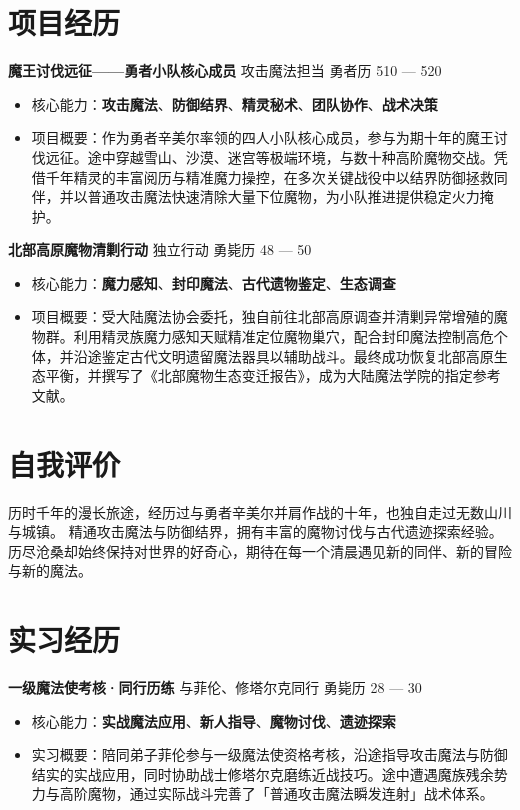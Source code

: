 \documentclass[11pt,a4paper]{article}
\newcommand*{\boldtext}[1]{{\bfseries #1}}
\newcommand{\globalIconSize}{12pt}
\newcommand{\secicon}[1]{{\color{globalIconColor}\fontsize{\globalIconSize}{\globalIconSize}\selectfont #1}}
\begin{document}
\section{\secicon{\faProjectDiagram}\hspace{0.5em}项目经历}
\boldtext{魔王讨伐远征——勇者小队核心成员} \hfill 攻击魔法担当 \hfill 勇者历 510 — 520
\begin{itemize}
    \item 核心能力：\boldtext{攻击魔法}、\boldtext{防御结界}、\boldtext{精灵秘术}、\boldtext{团队协作}、\boldtext{战术决策}
    \item 项目概要：作为勇者辛美尔率领的四人小队核心成员，参与为期十年的魔王讨伐远征。途中穿越雪山、沙漠、迷宫等极端环境，与数十种高阶魔物交战。凭借千年精灵的丰富阅历与精准魔力操控，在多次关键战役中以结界防御拯救同伴，并以普通攻击魔法快速清除大量下位魔物，为小队推进提供稳定火力掩护。
\end{itemize}

\vspace{0.8em}
\boldtext{北部高原魔物清剿行动} \hfill 独立行动 \hfill 勇毙历 48 — 50
\begin{itemize}
    \item 核心能力：\boldtext{魔力感知}、\boldtext{封印魔法}、\boldtext{古代遗物鉴定}、\boldtext{生态调查}
    \item 项目概要：受大陆魔法协会委托，独自前往北部高原调查并清剿异常增殖的魔物群。利用精灵族魔力感知天赋精准定位魔物巢穴，配合封印魔法控制高危个体，并沿途鉴定古代文明遗留魔法器具以辅助战斗。最终成功恢复北部高原生态平衡，并撰写了《北部魔物生态变迁报告》，成为大陆魔法学院的指定参考文献。
\end{itemize}

\section{\secicon{\faUser}\hspace{0.5em}自我评价}
历时千年的漫长旅途，经历过与勇者辛美尔并肩作战的十年，也独自走过无数山川与城镇。
精通攻击魔法与防御结界，拥有丰富的魔物讨伐与古代遗迹探索经验。
历尽沧桑却始终保持对世界的好奇心，期待在每一个清晨遇见新的同伴、新的冒险与新的魔法。

\newpage
\section{\secicon{\faBriefcase}\hspace{0.5em}实习经历}
\boldtext{一级魔法使考核·同行历练} \hfill 与菲伦、修塔尔克同行 \hfill 勇毙历 28 — 30
\begin{itemize}
    \item 核心能力：\boldtext{实战魔法应用}、\boldtext{新人指导}、\boldtext{魔物讨伐}、\boldtext{遗迹探索}
    \item 实习概要：陪同弟子菲伦参与一级魔法使资格考核，沿途指导攻击魔法与防御结实的实战应用，同时协助战士修塔尔克磨练近战技巧。途中遭遇魔族残余势力与高阶魔物，通过实际战斗完善了「普通攻击魔法瞬发连射」战术体系。
\end{itemize}
\end{document}

